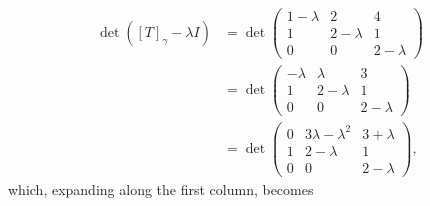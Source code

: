 \documentclass[11pt]{scrartcl}
\begin{document}
\begin{linenumbers}
\begin{soln}
    \begin{align*}
      \det([T]_{\gamma}-\lambda I)                                         & =
      \det\begin{pmatrix}
        1 - \lambda                                                        & 2         & 4 \\
        1                                                                  & 2-\lambda & 1 \\
        0                                                                  & 0         & 2-\lambda
      \end{pmatrix}                                                                        \\
                                                                           & =
                                                               \det\begin{pmatrix}
                                                                 - \lambda & \lambda   & 3 \\
                                                                 1         & 2-\lambda & 1 \\
                                                                 0         & 0
                                                                           &
                                                                 2-\lambda
                                                               \end{pmatrix}               \\
                                                                           & =
                                                               \det\begin{pmatrix}
                                                                 0 & 3\lambda - \lambda^{2}   & 3 + \lambda \\
                                                                 1         & 2-\lambda & 1 \\
                                                                 0         & 0
                                                                           &
                                                                 2-\lambda
                                                               \end{pmatrix},
    \end{align*}
    which, expanding along the first column, becomes


\end{soln}
\end{linenumbers}
\end{document}
